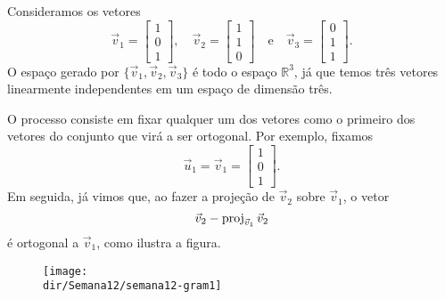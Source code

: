 \documentclass[../livro.tex]{subfiles}  %
\providecommand{\dir}{..}
\begin{document}
\begin{example}
Consideramos os vetores
\begin{equation}
\vec{v}_1 =
\begin{bmatrix}
1 \\ 0 \\ 1
\end{bmatrix}, \quad
\vec{v}_2 =
\begin{bmatrix}
1 \\ 1 \\ 0
\end{bmatrix} \quad \text{e} \quad
\vec{v}_3 =
\begin{bmatrix}
0 \\ 1 \\ 1
\end{bmatrix}.
\end{equation} O espaço gerado por $\{\vec{v}_1, \vec{v}_2, \vec{v}_3 \}$ é todo o espaço $\mathbb{R}^3$, já que temos três vetores  linearmente independentes em um espaço de dimensão três.

O processo consiste em fixar qualquer um dos vetores como o primeiro dos vetores do conjunto que virá a ser ortogonal. Por exemplo, fixamos
\begin{equation}
\vec{u}_1 = \vec{v}_1 =
\begin{bmatrix}
1 \\ 0 \\ 1
\end{bmatrix}.
\end{equation} Em seguida, já vimos que, ao fazer a projeção de $\vec{v}_2$ sobre $\vec{v}_1$, o vetor
\begin{equation}
\vec{v}_2 - \operatorname{proj}_{\vec{v}_1} \vec{v}_2
\end{equation} é ortogonal a $\vec{v}_1$, como ilustra a figura.
\begin{figure}[h!]
\begin{center}
\texttt{[image: \\dir/Semana12/semana12-gram1]}
\end{center}
\end{figure}


\end{example}
\end{document}
